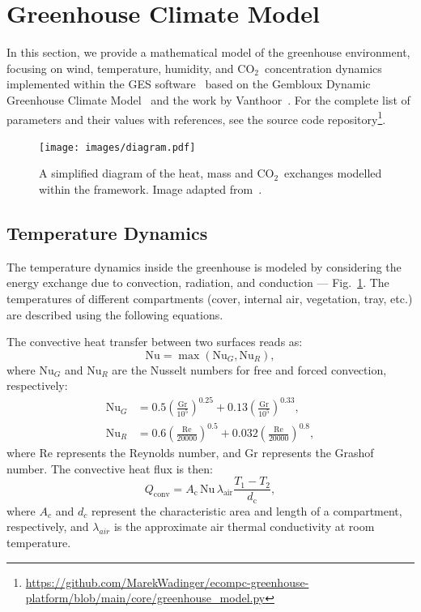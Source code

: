 \documentclass[conference]{IEEEtran}
\newcommand{\coo}{\ensuremath{\mathrm{CO_2}}}
\begin{document}
\section{Greenhouse Climate Model}\label{sec:greenhouse}
In this section, we provide a mathematical model of the greenhouse environment, focusing on wind, temperature, humidity, and \coo\ concentration dynamics implemented within the GES software~\cite{rmward61_2019} based on the Gembloux Dynamic Greenhouse Climate Model~\cite{GDGCM} and the work by Vanthoor~\cite{Vanthoor2011}. For the complete list of parameters and their values with references, see the source code repository\footnote{\url{https://github.com/MarekWadinger/ecompc-greenhouse-platform/blob/main/core/greenhouse_model.py}}.

\begin{figure}
    \centering
    \texttt{[image: images/diagram.pdf]}
    \caption{A simplified diagram of the heat, mass and \coo\ exchanges modelled within the framework. Image adapted from~\cite{rmward61_2019}.}\label{fig:diagram}
\end{figure}

\subsection{Temperature Dynamics}\label{subsec:temperature}

The temperature dynamics inside the greenhouse is modeled by considering the energy exchange due to convection, radiation, and conduction --- Fig.~\ref{fig:diagram}. The temperatures of different compartments (cover, internal air, vegetation, tray, etc.) are described using the following equations.

The convective heat transfer between two surfaces reads as:
\begin{equation}
    \text{Nu} = \max \left( \text{Nu}_G, \text{Nu}_R \right),
\end{equation}
where \(\text{Nu}_G\) and \(\text{Nu}_R\) are the Nusselt numbers for free and forced convection, respectively:
\begin{align}
    \text{Nu}_G & = 0.5  {\left( \frac{\text{Gr}}{10^5} \right)}^{0.25} + 0.13  {\left(\frac{\text{Gr}}{10^5}\right)}^{0.33}, \\
    \text{Nu}_R & = 0.6  {\left(\frac{\text{Re}}{20000}\right)}^{0.5} + 0.032  {\left(\frac{\text{Re}}{20000}\right)}^{0.8},
\end{align}
where Re represents the Reynolds number, and Gr represents the Grashof number. The convective heat flux is then:
\begin{equation}
    Q_{\text{conv}} = A_{\text{c}}\, \text{Nu}\, \lambda_{\text{air}} \frac{T_1 - T_2}{d_{\text{c}}},
\end{equation}
where \(A_c\) and \(d_c\) represent the characteristic area and length of a compartment, respectively, and \(\lambda_{air}\) is the approximate air thermal conductivity at room temperature.
\end{document}
